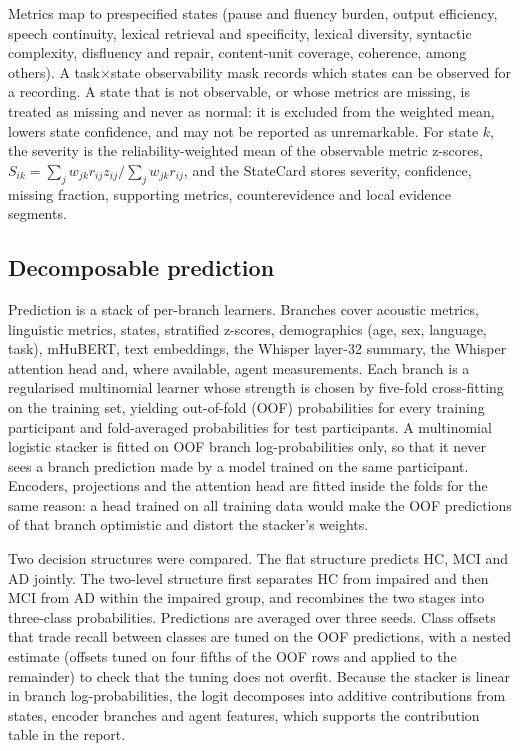 \documentclass[pdflatex,sn-nature]{sn-jnl}
\begin{document}
Metrics map to prespecified states (pause and fluency burden, output efficiency, speech continuity, lexical retrieval and specificity, lexical diversity, syntactic complexity, disfluency and repair, content-unit coverage, coherence, among others). A task$\times$state observability mask records which states can be observed for a recording. A state that is not observable, or whose metrics are missing, is treated as missing and never as normal: it is excluded from the weighted mean, lowers state confidence, and may not be reported as unremarkable. For state $k$, the severity is the reliability-weighted mean of the observable metric z-scores, $S_{ik}=\sum_j w_{jk}r_{ij}z_{ij}/\sum_j w_{jk}r_{ij}$, and the StateCard stores severity, confidence, missing fraction, supporting metrics, counterevidence and local evidence segments.

\subsection{Decomposable prediction}\label{sec:m-pred}

Prediction is a stack of per-branch learners. Branches cover acoustic metrics, linguistic metrics, states, stratified z-scores, demographics (age, sex, language, task), mHuBERT, text embeddings, the Whisper layer-32 summary, the Whisper attention head and, where available, agent measurements. Each branch is a regularised multinomial learner whose strength is chosen by five-fold cross-fitting on the training set, yielding out-of-fold (OOF) probabilities for every training participant and fold-averaged probabilities for test participants. A multinomial logistic stacker is fitted on OOF branch log-probabilities only, so that it never sees a branch prediction made by a model trained on the same participant. Encoders, projections and the attention head are fitted inside the folds for the same reason: a head trained on all training data would make the OOF predictions of that branch optimistic and distort the stacker's weights.

Two decision structures were compared. The flat structure predicts HC, MCI and AD jointly. The two-level structure first separates HC from impaired and then MCI from AD within the impaired group, and recombines the two stages into three-class probabilities. Predictions are averaged over three seeds. Class offsets that trade recall between classes are tuned on the OOF predictions, with a nested estimate (offsets tuned on four fifths of the OOF rows and applied to the remainder) to check that the tuning does not overfit. Because the stacker is linear in branch log-probabilities, the logit decomposes into additive contributions from states, encoder branches and agent features, which supports the contribution table in the report.
\end{document}
